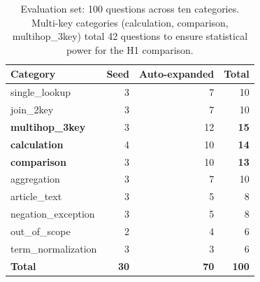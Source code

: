 \begin{table}[t]
\centering
\caption{Evaluation set: 100 questions across ten categories. Multi-key
categories (calculation, comparison, multihop\_3key) total 42 questions
to ensure statistical power for the H1 comparison.}
\label{tab:eval-set}
\small
\begin{tabular}{l r r r}
\toprule
Category & Seed & Auto-expanded & Total \\
\midrule
single\_lookup        & 3 & 7 & 10 \\
join\_2key            & 3 & 7 & 10 \\
\textbf{multihop\_3key} & 3 & 12 & \textbf{15} \\
\textbf{calculation}    & 4 & 10 & \textbf{14} \\
\textbf{comparison}     & 3 & 10 & \textbf{13} \\
aggregation           & 3 & 7 & 10 \\
article\_text         & 3 & 5 & 8 \\
negation\_exception   & 3 & 5 & 8 \\
out\_of\_scope        & 2 & 4 & 6 \\
term\_normalization   & 3 & 3 & 6 \\
\midrule
\textbf{Total}        & \textbf{30} & \textbf{70} & \textbf{100} \\
\bottomrule
\end{tabular}
\end{table}
